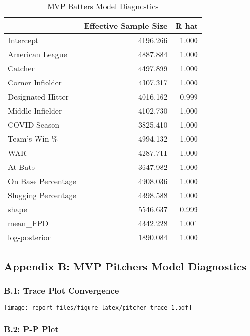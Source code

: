 \documentclass[
]{article}
\begin{document}
\begin{table}[H]

\caption{\label{tab:batter-diagnostics}MVP Batters Model Diagnostics}
\centering
\begin{tabular}[t]{l|r|r}
\hline
  & Effective Sample Size & R hat\\
\hline
Intercept & 4196.266 & 1.000\\
\hline
American League & 4887.884 & 1.000\\
\hline
Catcher & 4497.899 & 1.000\\
\hline
Corner Infielder & 4307.317 & 1.000\\
\hline
Designated Hitter & 4016.162 & 0.999\\
\hline
Middle Infielder & 4102.730 & 1.000\\
\hline
COVID Season & 3825.410 & 1.000\\
\hline
Team's Win \% & 4994.132 & 1.000\\
\hline
WAR & 4287.711 & 1.000\\
\hline
At Bats & 3647.982 & 1.000\\
\hline
On Base Percentage & 4908.036 & 1.000\\
\hline
Slugging Percentage & 4398.588 & 1.000\\
\hline
shape & 5546.637 & 0.999\\
\hline
mean\_PPD & 4342.228 & 1.001\\
\hline
log-posterior & 1890.084 & 1.000\\
\hline
\end{tabular}
\end{table}

\hypertarget{appendix-b-mvp-pitchers-model-diagnostics}{%
\subsection{Appendix B: MVP Pitchers Model
Diagnostics}\label{appendix-b-mvp-pitchers-model-diagnostics}}

\hypertarget{b.1-trace-plot-convergence}{%
\subsubsection{B.1: Trace Plot
Convergence}\label{b.1-trace-plot-convergence}}

\texttt{[image: report\_files/figure-latex/pitcher-trace-1.pdf]}

\hypertarget{b.2-p-p-plot}{%
\subsubsection{B.2: P-P Plot}\label{b.2-p-p-plot}}
\end{document}

